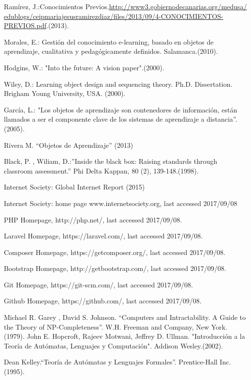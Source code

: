 \documentclass{llncs}
\begin{document}
%
\begin{thebibliography}{5}
%

Ramírez, J.:Conocimientos Previos.\url{http://www3.gobiernodecanarias.org/medusa/
edublogs/ceipmariajesusramirezdiaz/files/2013/09/4-CONOCIMIENTOS-PREVIOS.pdf}.(2013).

Morales, E.:
Gestión del conocimiento e-learning, basado en objetos de aprendizaje, cualitativa y pedagógicamente definidos.
Salamanca.(2010).

Hodgins, W.:
"Into the future: A vision paper".(2000).

Wiley, D.:
Learning object design and sequencing theory. Ph.D. Dissertation.
Brigham Young University, USA. (2000).

García, L.:
"Los objetos de aprendizaje son contenedores de información, están llamados a ser el componente clave de los sistemas de aprendizaje a distancia”.(2005).

Rivera M. “Objetos de Aprendizaje” (2013)

Black, P. , Wiliam, D.:”Inside the black box: Raising standards through classroom assessment.” Phi Delta Kappan, 80 (2), 139-148.(1998).

Internet Society: Global Internet Report (2015)

Internet Society: home page www.internetsociety.org, last accessed 2017/09/08


PHP Homepage, http://php.net/, last accessed 2017/09/08.

Laravel Homepage, https://laravel.com/, last accessed 2017/09/08.

Composer Homepage, https://getcomposer.org/, last accessed 2017/09/08.

Bootstrap Homepage, http://getbootstrap.com/, last accessed 2017/09/08.

Git Homepage, https://git-scm.com/, last accessed 2017/09/08.

Github Homepage, https://github.com/, last accessed 2017/09/08.

Michael R. Garey , David S. Johnson. “Computers and Intractability. A Guide to         the Theory of NP-Completeness”. W.H. Freeman and Company, New York.(1979).
John E. Hopcroft, Rajeev Motwani, Jeffrey D. Ullman. "Introducción a la Teoría de Autómatas, Lenguajes y Computación".  Addison Wesley.(2002).

Dean Kelley.“Teoría de Autómatas y Lenguajes Formales”. Prentice-Hall Inc.(1995).



\end{thebibliography}
\end{document}
